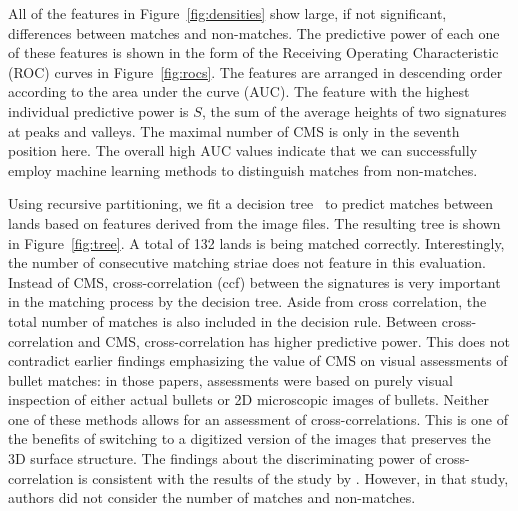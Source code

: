 \documentclass[aoas, preprint]{imsart}\usepackage[]{graphicx}\usepackage[]{color}
\begin{document}
All of the features in Figure~\ref{fig:densities} show large, if not significant, differences between matches and non-matches. The predictive power of each one of these features is shown in the form of the Receiving Operating Characteristic (ROC) curves in Figure~\ref{fig:rocs}. The features are arranged in descending order according to the area under the curve (AUC). The feature with the highest individual predictive power is $S$, the sum of the average heights of two signatures at peaks and valleys. The maximal number of CMS is only in the seventh position here. The overall high AUC values indicate that we can successfully employ machine learning methods to distinguish matches from non-matches.

Using recursive partitioning, we fit a decision tree~\citep{breiman:1984, rpart, rpart.plot} to predict matches between lands based on features derived from the image files. The resulting tree is shown in Figure~\ref{fig:tree}. A total of 132 lands is being matched correctly. Interestingly, the number of consecutive matching striae does not feature in this evaluation. 
Instead of CMS, cross-correlation (ccf) between the signatures is very important in the matching process  by the decision tree. Aside from  cross correlation, the total number of matches is also included in the decision rule. 
Between cross-correlation and CMS, cross-correlation has higher  predictive power. This  does not  contradict earlier findings emphasizing the value of CMS on visual assessments of bullet matches: in those papers, assessments were based on purely visual inspection of either actual bullets or 2D microscopic images of bullets.
Neither one of these methods allows for an assessment of cross-correlations. This is one of the benefits of switching to a digitized version of the images that preserves the 3D surface structure. The findings about the discriminating power of cross-correlation is consistent with the results of the study by \citet{ma:2004}. However, in that study, authors did not consider the number of matches and non-matches.
\end{document}

